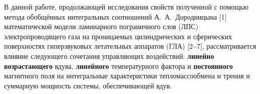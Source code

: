 \vzmscaption



     В  данной  работе, 
продолжающей  исследования  свойств
полученной
с  помощью  метода  
обобщённых  интегральных  соотношений 
А.~А.~Дородницына 
[1]  
математической  модели  
ламинарного  пограничного  слоя  
(ЛПС)
электропроводящего  газа  
на  проницаемых  цилиндрических  
и  сферических  поверхностях  
гиперзвуковых  летательных  аппаратов  
(ГЛА) 
[2{\textbf{--}}7], 
рассматривается  влияние  
следующего  сочетания
управляющих  воздействий:
\textbf{линейно  возрастающего}
вдува,  
\textbf{линейного}
температурного  фактора  
и  
\textbf{постоянного} 
магнитного  поля  
на  
интегральные 
характеристики  
тепломассообмена  и  трения
и  
суммарную  мощность  
системы,  
обеспечивающей  вдув.  



